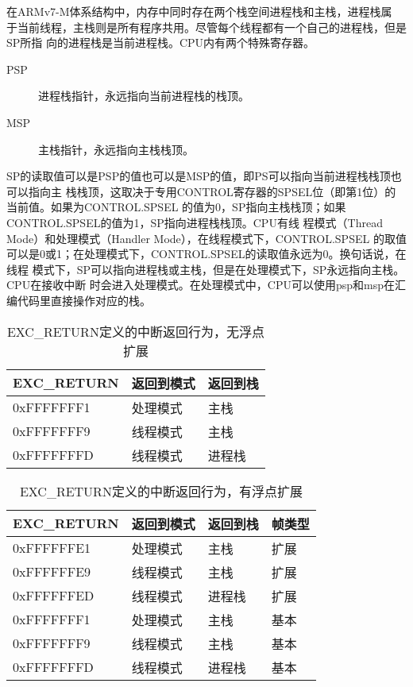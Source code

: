 在ARMv7-M体系结构中，内存中同时存在两个栈空间\pozhehao 进程栈和主栈，进程栈属
于当前线程，主栈则是所有程序共用。尽管每个线程都有一个自己的进程栈，但是SP所指
向的进程栈是当前进程栈。CPU内有两个特殊寄存器。

\begin{description}
	\item[PSP] 进程栈指针，永远指向当前进程栈的栈顶。
	\item[MSP] 主栈指针，永远指向主栈栈顶。
\end{description}

SP的读取值可以是PSP的值也可以是MSP的值，即PS可以指向当前进程栈栈顶也可以指向主
栈栈顶，这取决于专用CONTROL寄存器的SPSEL位（即第1位）的当前值。如果为CONTROL.SPSEL
的值为0，SP指向主栈栈顶；如果CONTROL.SPSEL的值为1，SP指向进程栈栈顶。CPU有线
程模式（Thread Mode）和处理模式（Handler Mode），在线程模式下，CONTROL.SPSEL
的取值可以是0或1；在处理模式下，CONTROL.SPSEL的读取值永远为0。换句话说，在线程
模式下，SP可以指向进程栈或主栈，但是在处理模式下，SP永远指向主栈。CPU在接收中断
时会进入处理模式。在处理模式中，CPU可以使用psp和msp在汇编代码里直接操作对应的栈。

\begin{table}[htb]
	\centering
	\caption{EXC\_RETURN定义的中断返回行为，无浮点扩展}
	\label{tab:exe_return_noFP}
	\begin{tabularx}{\linewidth}{XXX}
		\toprule[1.5pt]
		{\heiti EXC\_RETURN} & {\heiti 返回到模式} & {\heiti 返回到栈}\\
		\midrule[1pt]
		0xFFFFFFF1 & 处理模式 & 主栈 \\
		\midrule[0.5pt]
		0xFFFFFFF9 & 线程模式 & 主栈 \\
		\midrule[0.5pt]
		0xFFFFFFFD & 线程模式 & 进程栈 \\
		\bottomrule[1.5pt]
	\end{tabularx}
\end{table}

\begin{table}[htb]
	\centering
	\caption{EXC\_RETURN定义的中断返回行为，有浮点扩展}
	\label{tab:exe_return_FP}
	\begin{tabularx}{\linewidth}{XXXX}
		\toprule[1.5pt]
		{\heiti EXC\_RETURN} & {\heiti 返回到模式} & {\heiti 返回到栈} &
		{\heiti 帧类型}\\
		\midrule[1pt]
		0xFFFFFFE1 & 处理模式 & 主栈 & 扩展\\
		\midrule[0.5pt]
		0xFFFFFFE9 & 线程模式 & 主栈 & 扩展\\
		\midrule[0.5pt]
		0xFFFFFFED & 线程模式 & 进程栈 & 扩展\\
		\midrule[0.5pt]
		0xFFFFFFF1 & 处理模式 & 主栈 & 基本\\
		\midrule[0.5pt]
		0xFFFFFFF9 & 线程模式 & 主栈 & 基本\\
		\midrule[0.5pt]
		0xFFFFFFFD & 线程模式 & 进程栈 & 基本\\
		\bottomrule[1.5pt]
	\end{tabularx}
\end{table}

